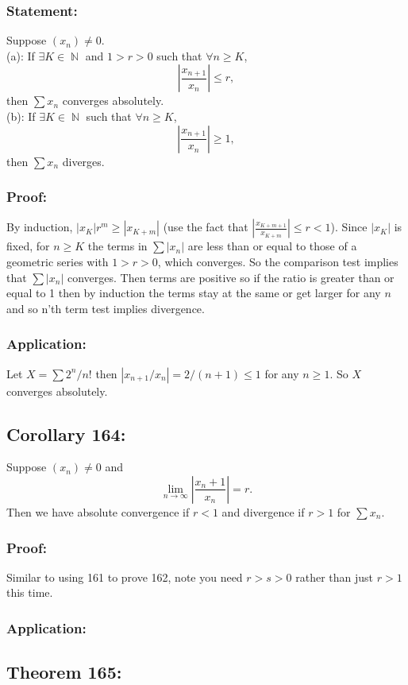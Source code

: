 \documentclass{article}
\DeclareMathOperator\N{\mathbb{N}}
\begin{document}
\subsubsection*{Statement:}
Suppose $(x_n) \neq 0$.  \\
\newline
(a): If $\exists K \in \N$ and $1>r>0$ such that $\forall n \geq K$, $$
\left| \frac{x_{n+1}}{x_n} \right| \leq r,
$$
then $\sum x_n$ converges absolutely. \\
\newline
(b): If $\exists K \in \N$ such that $\forall n \geq K$, $$
\left| \frac{x_{n+1}}{x_n} \right| \geq 1,
$$
then $\sum x_n$ diverges.
\subsubsection*{Proof:}
By induction, $|x_K|r^m \geq |x_{K+m}|$ (use the fact that $|\frac{x_{K+m+1}}{x_{K+m}}| \leq r < 1$).
Since $|x_K|$ is fixed, for $n \geq K$ the terms in $\sum |x_n|$ are less than or equal to
those of a geometric series with $1>r>0$, which converges. So the comparison test implies that
$\sum |x_n|$ converges. Then terms are positive so if the ratio is greater than or equal to 1 then
by induction the terms stay at the same or get larger
for any $n$ and so n'th term test implies divergence.
\subsubsection*{Application:}
Let $X = \sum 2^n \slash n!$ then $|x_{n+1} \slash x_n| = 2 \slash (n+1) \leq 1$ for any $n \geq 1$.
So $X$ converges absolutely.
\subsection{Corollary 164:}
Suppose $(x_n) \neq 0$ and $$
\lim_{n \to \infty} \left| \frac{x_n+1}{x_n} \right| = r.
$$
Then we have absolute convergence if $r<1$ and divergence if $r>1$ for $\sum x_n$.
\subsubsection*{Proof:}
Similar to using 161 to prove 162, note you need $r>s>0$ rather than just $r>1$
this time.
\subsubsection*{Application:}
\subsection{Theorem 165:}
\end{document}
